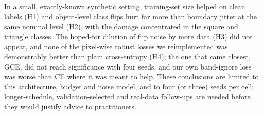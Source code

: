 In a small, exactly-known synthetic setting, training-set size helped on clean labels (H1) and object-level class flips hurt far more than boundary jitter at the same nominal level (H2), with the damage concentrated in the square and triangle classes. The hoped-for dilution of flip noise by more data (H3) did not appear, and none of the pixel-wise robust losses we reimplemented was demonstrably better than plain cross-entropy (H4); the one that came closest, GCE, did not reach significance with four seeds, and our own band-ignore loss was worse than CE where it was meant to help. These conclusions are limited to this architecture, budget and noise model, and to four (or three) seeds per cell; longer-schedule, validation-selected and real-data follow-ups are needed before they would justify advice to practitioners.
